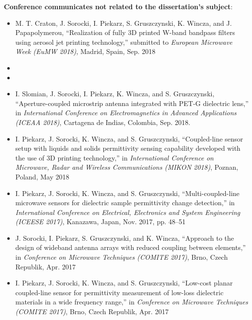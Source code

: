 \noindent \textbf{Conference communicates not related to the dissertation's subject}:
\begin{itemize}[nosep]
\item M. T. Craton, J. Sorocki, I. Piekarz, S. Gruszczynski, K. Wincza, and J. Papapolymerou,
“Realization of fully 3D printed W-band bandpass filters using aerosol jet printing technology,”
submitted to \textit{European Microwave Week (EuMW 2018)}, Madrid, Spain, Sep. 2018
\item {}
\item {}
\item I. Slomian, J. Sorocki, I. Piekarz, K. Wincza, and S. Gruszczynski, “Aperture-coupled microstrip antenna integrated with PET-G dielectric lens,” in \textit{International Conference on Electromagnetics in Advanced Applications (ICEAA 2018)}, Cartagena de Indias, Colombia, Sep. 2018.
\item I. Piekarz, J. Sorocki, K. Wincza, and S. Gruszczynski, “Coupled-line sensor setup with liquids and solids permittivity sensing capability developed with the use of 3D printing technology,” in \textit{International Conference on Microwave, Radar and Wireless Communications (MIKON 2018)}, Poznan, Poland, May 2018
\item I. Piekarz, J. Sorocki, K. Wincza, and S. Gruszczynski, “Multi-coupled-line microwave sensors for dielectric sample permittivity change detection,” in \textit{International Conference on Electrical, Electronics and System Engineering (ICEESE 2017)}, Kanazawa, Japan, Nov. 2017, pp. 48–51
\item J. Sorocki, I. Piekarz, S. Gruszczynski, and K. Wincza, “Approach to the design of wideband
antenna arrays with reduced coupling between elements,” in \textit{Conference on Microwave Techniques
(COMITE 2017)}, Brno, Czech Republik, Apr. 2017
\item I. Piekarz, J. Sorocki, K. Wincza, and S. Gruszczynski, “Low-cost planar coupled-line sensor for permittivity measurement of low-loss dielectric materials in a wide frequency range,” in \textit{Conference on Microwave Techniques (COMITE 2017)}, Brno, Czech Republik, Apr. 2017

\end{itemize}
